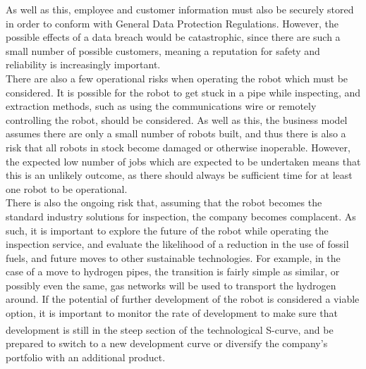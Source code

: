 \documentclass[11pt]{article}		%
\newcommand{\supercite}[1]{\textsuperscript{\cite{#1}}}		%
\begin{document}
     	As well as this, employee and customer information must also be securely stored in order to conform with General Data Protection Regulations.
     	However, the possible effects of a data breach would be catastrophic, since there are such a small number of possible customers, meaning a reputation for safety and reliability is increasingly important.
     	\\
     	There are also a few operational risks when operating the robot which must be considered.
     	It is possible for the robot to get stuck in a pipe while inspecting, and extraction methods, such as using the communications wire or remotely controlling the robot, should be considered.
     	As well as this, the business model assumes there are only a small number of robots built, and thus there is also a risk that all robots in stock become damaged or otherwise inoperable.
     	However, the expected low number of jobs which are expected to be undertaken means that this is an unlikely outcome, as there should always be sufficient time for at least one robot to be operational.
     	\\
     	There is also the ongoing risk that, assuming that the robot becomes the standard industry solutions for inspection, the company becomes complacent.
     	As such, it is important to explore the future of the robot while operating the inspection service, and evaluate the likelihood of a reduction in the use of fossil fuels, and future moves to other sustainable technologies.
     	For example, in the case of a move to hydrogen pipes, the transition is fairly simple as similar, or possibly even the same, gas networks will be used to transport the hydrogen around.
     	If the potential of further development of the robot is considered a viable option, it is important to monitor the rate of development to make sure that development is still in the steep section of the technological S-curve\supercite{christensen1998innovation}, and be prepared to switch to a new development curve or diversify the company's portfolio with an additional product.
     	
	
	\pagebreak		%
	
	
	
	
	\begin{multicols}{2}
		\begingroup\onehalfspacing
			{\small
				
				
			}
		\endgroup
	\end{multicols}
	
\end{document}
